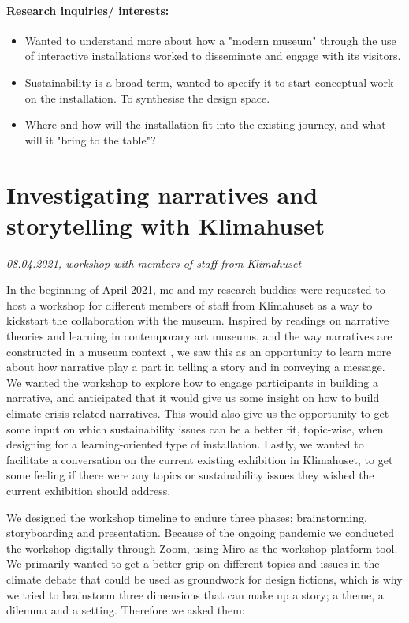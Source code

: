 \paragraph{Research inquiries/ interests: }
\begin{itemize}
    \item Wanted to understand more about how a "modern museum" through the use of interactive installations worked to disseminate and engage with its visitors.
    \item Sustainability is a broad term, wanted to specify it to start conceptual work on the installation. To synthesise the design space.
    \item Where and how will the installation fit into the existing journey, and what will it "bring to the table"?
\end{itemize}





\section{Investigating narratives and storytelling with Klimahuset}
\par
\emph{08.04.2021, workshop with members of staff from Klimahuset}
\par

In the beginning of April 2021, me and my research buddies were requested to host a workshop for different members of staff from Klimahuset as a way to kickstart the collaboration with the museum. Inspired by readings on narrative theories and learning in contemporary art museums, and the way narratives are constructed in a museum context \autocite{narrative_sitzia}, we saw this as an opportunity to learn more about how narrative play a part in telling a story and in conveying a message. We wanted the workshop to explore how to engage participants in building a narrative, and anticipated that it would give us some insight on how to build climate-crisis related narratives. This would also give us the opportunity to get some input on which sustainability issues can be a better fit, topic-wise, when designing for a learning-oriented type of installation. Lastly, we wanted to facilitate a conversation on the current existing exhibition in Klimahuset, to get some feeling if there were any topics or sustainability issues they wished the current exhibition should address.

We designed the workshop timeline to endure three phases; brainstorming, storyboarding and presentation. Because of the ongoing pandemic we conducted the workshop digitally through Zoom, using Miro as the workshop platform-tool. We primarily wanted to get a better grip on different topics and issues in the climate debate that could be used as groundwork for design fictions, which is why we tried to brainstorm three dimensions that can make up a story; a theme, a dilemma and a setting. Therefore we asked them:

